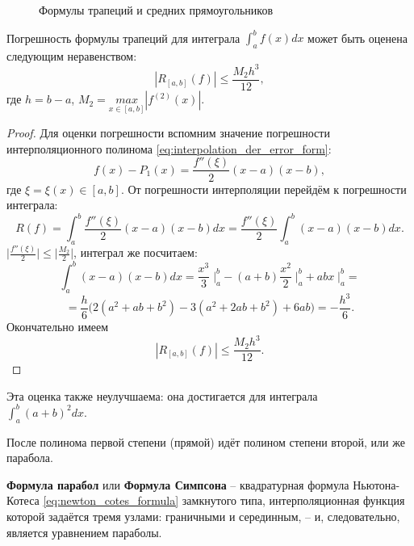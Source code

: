 \documentclass[../main.tex]{subfile}
\begin{document}
\begin{figure}[ht]
	\caption*{Формулы трапеций и средних прямоугольников}
\end{figure}

\begin{theorem}
\label{eq:trapezoidal_rule_error}
	Погрешность формулы трапеций для интеграла $\int_a^b f(x)dx$ может быть
	оценена следующим неравенством:
	\[\boxed{|R_{[a,b]}(f)|\le\frac{M_2h^3}{12}},\]
	где $h=b-a$, $M_2=\underset{x\in[a,b]}{max}|f^{(2)}(x)|.$
\end{theorem}
\newpage

\begin{proof}
	Для оценки погрешности вспомним значение погрешности интерполяционного
	полинома \eqref{eq:interpolation_der_error_form}:
	\[f(x)-P_1(x)=\frac{f''(\xi)}{2}(x-a)(x-b),\]
	где $\xi=\xi(x)\in[a,b]$. От погрешности интерполяции перейдём к
	погрешности интеграла:
	\[R(f)=\int_a^b\frac{f''(\xi)}{2}(x-a)(x-b)dx=\frac{f''(\xi)}{2}\int_a^b
	(x-a)(x-b)dx.\]
	$\big|\frac{f''(\xi)}{2}\big|\le\big|\frac{M_2}{2}\big|$, интеграл же
	посчитаем:
	\[\int_a^b(x-a)(x-b)dx=\frac{x^3}{3}\;\Big|_a^b-(a+b)\frac{x^2}{2}\;
	\Big|_a^b+abx\;\Big|_a^b=\]
	\[=\frac{h}{6}\Big(2(a^2+ab+b^2)-3(a^2+2ab+b^2)+6ab\Big)=-\frac{h^3}{6}.
	\]
	Окончательно имеем
	\[|R_{[a,b]}(f)|\le\frac{M_2h^3}{12}.\]
\end{proof}

Эта оценка также неулучшаема: она достигается для интеграла\\
$\int_a^b (a+b)^2dx$.

После полинома первой степени (прямой) идёт полином степени второй, или же
парабола.

\begin{define}
	\textbf{Формула парабол} или \textbf{Формула Симпсона} -- квадратурная
	формула Ньютона-Котеса \eqref{eq:newton_cotes_formula} замкнутого типа,
	интерполяционная функция которой задаётся тремя узлами: граничными и
	серединным, -- и, следовательно, является уравнением параболы.
\end{define}
\end{document}
